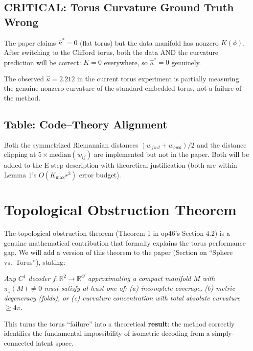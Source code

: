 \documentclass{article}
\begin{document}
\subsection{CRITICAL: Torus Curvature Ground Truth Wrong}

\begin{accept}[Accepted]
The paper claims $\hat{\kappa}^* = 0$ (flat torus) but the data manifold has
nonzero $K(\phi)$. After switching to the Clifford torus, both the data AND
the curvature prediction will be correct: $K = 0$ everywhere, so
$\hat{\kappa}^* = 0$ genuinely.

The observed $\hat{\kappa} = 2.212$ in the current torus experiment is partially
measuring the genuine nonzero curvature of the standard embedded torus, not
a failure of the method.
\end{accept}

\subsection{Table: Code--Theory Alignment}

\begin{accept}
Both the symmetrized Riemannian distances $(w_{fwd} + w_{bwd})/2$ and the
distance clipping at $5 \times \mathrm{median}(w_{ij})$ are implemented but
not in the paper. Both will be added to the E-step description with theoretical
justification (both are within Lemma 1's $O(K_{\max} r^3)$ error budget).
\end{accept}

\section{Topological Obstruction Theorem}

\begin{accept}
The topological obstruction theorem (Theorem 1 in op46's Section 4.2) is a
genuine mathematical contribution that formally explains the torus performance
gap. We will add a version of this theorem to the paper (Section on
``Sphere vs.\ Torus''), stating:

\textit{Any $C^1$ decoder $f: \mathbb{R}^2 \to \mathbb{R}^G$ approximating
a compact manifold $M$ with $\pi_1(M) \neq 0$ must satisfy at least one of:
(a) incomplete coverage, (b) metric degeneracy (folds), or (c) curvature
concentration with total absolute curvature $\geq 4\pi$.}

This turns the torus ``failure'' into a theoretical \textbf{result}: the method
correctly identifies the fundamental impossibility of isometric decoding from
a simply-connected latent space.
\end{accept}
\end{document}
